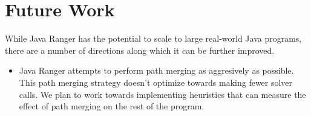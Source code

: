\section{Future Work}
\label{sec:futureWork}
While Java Ranger has the potential to scale to large real-world Java programs, there are a number of directions along
which it can be further improved.
\begin{itemize}

\item Java Ranger attempts to perform path merging as aggresively as possible. This path merging strategy doesn't
optimize towards making fewer solver calls. We plan to work towards implementing heuristics that
can measure the effect of path merging on the rest of the program.
    
%


\end{itemize}
